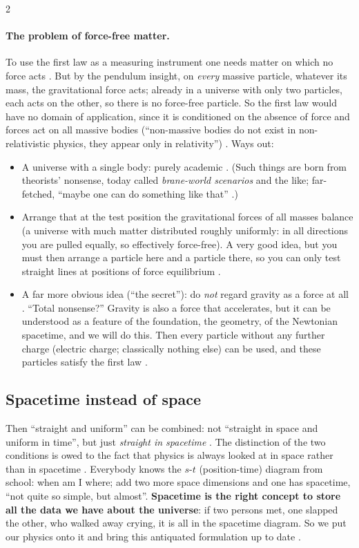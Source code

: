\begin{paracol}{2}
\paragraph{The problem of force-free matter.} To use the first law as a measuring instrument one needs matter on which no
force acts . But by the pendulum insight, on \emph{every} massive particle, whatever its mass, the
gravitational force acts; already in a universe with only two particles, each acts on the other, so there is no
force-free particle. So the first law would have no domain of application, since it is conditioned on the absence of
force and forces act on all massive bodies (``non-massive bodies do not exist in non-relativistic physics, they
appear only in relativity'') . Ways out:
\begin{itemize}
  \item A universe with a single body: purely academic . (Such things are born from theorists'
        nonsense, today called \emph{brane-world scenarios} and the like; far-fetched, ``maybe one can do something
        like that'' .)
  \item Arrange that at the test position the gravitational forces of all masses balance (a universe with much matter
        distributed roughly uniformly: in all directions you are pulled equally, so effectively force-free). A very good
        idea, but you must then arrange a particle here and a particle there, so you can only test straight lines
        at positions of force equilibrium .
  \item A far more obvious idea (``the secret''): do \emph{not} regard gravity as a force at all .
        ``Total nonsense?'' Gravity is also a force that accelerates, but it can be understood as a feature of the
        foundation, the geometry, of the Newtonian spacetime, and we will do this. Then every particle without any
        further charge (electric charge; classically nothing else) can be used, and these particles satisfy the first
        law .
\end{itemize}

\subsection{Spacetime instead of space}\label{ssec:bv-spacetime}

Then ``straight and uniform'' can be combined: not ``straight in space and uniform in time'', but just \emph{straight
in spacetime} . The distinction of the two conditions is owed to the fact that physics is
always looked at in space rather than in spacetime . Everybody knows the $s$-$t$ (position-time)
diagram from school: when am I where; add two more space dimensions and one has spacetime, ``not quite so simple, but
almost''. \textbf{Spacetime is the right concept to store all the data we have about the universe}: if two persons met,
one slapped the other, who walked away crying, it is all in the spacetime diagram. So we put our physics onto it and
bring this antiquated formulation up to date .


\end{paracol}
